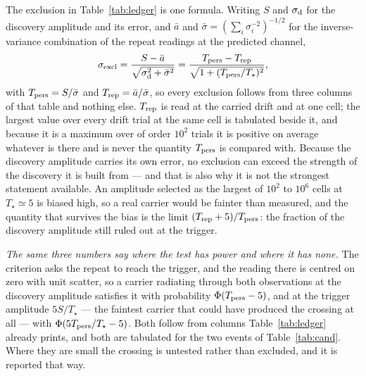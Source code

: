 The exclusion in Table~\ref{tab:ledger} is one formula. Writing $S$ and
$\sigma_{\rm d}$ for the discovery amplitude and its error, and $\bar{a}$ and
$\bar{\sigma}=(\sum_i\sigma_i^{-2})^{-1/2}$ for the inverse-variance
combination of the repeat readings at the predicted channel,
\begin{equation}
\sigma_{\rm excl}=\frac{S-\bar{a}}
{\sqrt{\sigma_{\rm d}^{2}+\bar{\sigma}^{2}}}
=\frac{T_{\rm pers}-T_{\rm rep}}{\sqrt{1+(T_{\rm pers}/T_\star)^{2}}},
\label{eq:excl}
\end{equation}
with $T_{\rm pers}=S/\bar{\sigma}$ and $T_{\rm rep}=\bar{a}/\bar{\sigma}$, so
every exclusion follows from three columns of that table and nothing else.
$T_{\rm rep}$ is read at the carried drift and at one cell; the largest value
over every drift trial at the same cell is tabulated beside it, and because it
is a maximum over of order $10^{2}$ trials it is positive on average whatever
is there and is never the quantity $T_{\rm pers}$ is compared with. Because the
discovery amplitude carries its own error, no exclusion can exceed the strength
of the discovery it is built from --- and that is also why it is not the
strongest statement available. An amplitude selected as the largest of
$10^{2}$ to $10^{6}$ cells at $T_\star\simeq5$ is biased high, so a real
carrier would be fainter than measured, and the quantity that survives the
bias is the limit $(T_{\rm rep}+5)/T_{\rm pers}$: the fraction of the
discovery amplitude still ruled out at the trigger.

\emph{The same three numbers say where the test has power and where it has
none.} The criterion asks the repeat to reach the trigger, and the reading
there is centred on zero with unit scatter, so a carrier radiating through
both observations at the discovery amplitude satisfies it with probability
$\Phi(T_{\rm pers}-5)$, and at the trigger amplitude $5S/T_\star$ ---
the faintest carrier that could have produced the crossing at all ---
with $\Phi(5T_{\rm pers}/T_\star-5)$. Both follow from columns
Table~\ref{tab:ledger} already prints, and both are tabulated for the two
events of Table~\ref{tab:cand}. Where
they are small the crossing is untested rather than excluded, and it is
reported that way.

